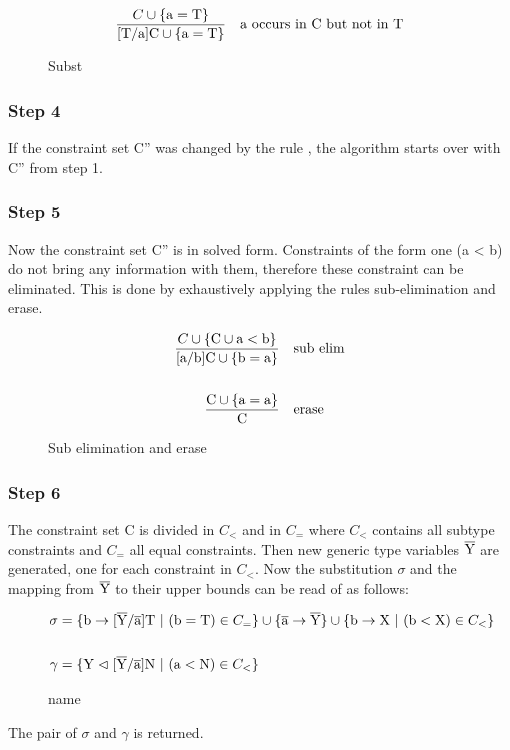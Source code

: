 \begin{figure}[H]
    \begin{align*}
        \frac{C \cup \{ \text{a} = \text{T} \}}{ \text{[T/a]C} \cup \{ \text{a} = \text{T} \} } \quad \text{a occurs in C but not in T}
    \end{align*}
    \caption{Subst}
    \label{subst}
\end{figure}

\subsubsection{Step 4}
If the constraint set C'' was changed by the rule , the algorithm starts over with C'' from step 1.

\subsubsection{Step 5}
Now the constraint set C'' is in solved form. Constraints of the form one (a < b) do not bring any information with them, therefore these constraint can be eliminated.
This is done by exhaustively applying the rules sub-elimination and erase.

\begin{figure}[H]
    \begin{align*}
        \frac{C \cup \{ \text{C} \cup \text{a} < \text{b} \}}{ \text{[a/b]C} \cup \{ \text{b} = \text{a} \} } \quad &\text{sub elim}
        \\
        \\
        \frac{\text{C} \cup \{ \text{a} = \text{a} \} }{ \text{C} } \quad &\text{erase}
    \end{align*}
    \caption{Sub elimination and erase}
    \label{subelim_erase}
\end{figure}

\subsubsection{Step 6}
The constraint set C is divided in $C_<$ and in $C_=$ where $C_<$ contains all subtype constraints and $C_=$ all equal constraints.
Then new generic type variables $\overline{\text{Y}}$ are generated, one for each constraint in $C_<$. Now the substitution $\sigma$ and the mapping from $\overline{\text{Y}}$ to their upper bounds can be read of as follows:

\begin{figure}[H]
    \begin{align*}
        \sigma &= \{ \text{b} \to \tsxsn{Y}{a}{T} \ | \ (\text{b} = \text{T}) \in C_= \} \cup \{ \ot{a} \to \ot{Y} \} \cup \{ \text{b} \to \text{X} \ | \ (\text{b} < \text{X}) \in C_< \}\\
        \\
        \gamma &= \{ \text{Y} \vartriangleleft \tsxsn{Y}{a}{N} \ | \ (\text{a} < \text{N}) \in C_< \}
    \end{align*}
    \caption{name}
    \label{name}
\end{figure}

The pair of $\sigma$ and $\gamma$ is returned.
